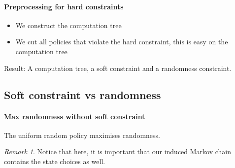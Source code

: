 \documentclass[conference]{IEEEtran}
\theoremstyle{remark}
\newtheorem{remark}{Remark}
\begin{document}
\paragraph{Preprocessing for hard constraints}
\begin{itemize}
\item We construct the computation tree	
\item We cut all policies that violate the hard constraint, this is easy on the computation tree
\end{itemize}
Result: A computation tree, a soft constraint and a randomness constraint.



\subsection{Soft constraint vs randomness}
\paragraph{Max randomness without soft constraint}
The uniform random policy maximises randomness.
\begin{remark}
Notice that here, it is important that our induced Markov chain contains the state choices as well.	
\end{remark}
\end{document}
